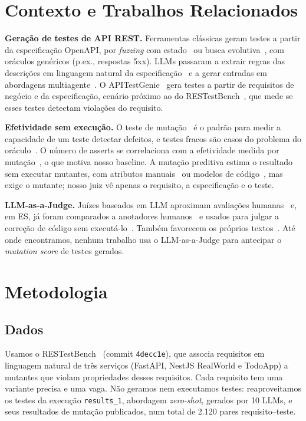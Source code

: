 \documentclass[sigconf,nonacm]{acmart}
\begin{document}
\section{Contexto e Trabalhos Relacionados}
\textbf{Geração de testes de API REST.} Ferramentas clássicas geram testes a partir da especificação OpenAPI,
por \emph{fuzzing} com estado~\cite{atlidakis2019restler} ou busca evolutiva~\cite{arcuri2019evomaster}, com
oráculos genéricos (p.ex., respostas 5xx). LLMs passaram a extrair regras das descrições em linguagem natural
da especificação~\cite{kim2024restgpt} e a gerar entradas em abordagens multiagente~\cite{kim2025multiagent}.
O APITestGenie~\cite{pereira2026apitestgenie} gera testes a partir de requisitos de negócio e da
especificação, cenário próximo ao do RESTestBench~\cite{restestbench}, que mede se esses testes detectam
violações do requisito.

\textbf{Efetividade sem execução.} O teste de mutação~\cite{jia2011mutation} é o padrão para medir a
capacidade de um teste detectar defeitos, e testes fracos são casos do problema do
oráculo~\cite{barr2015oracle}. O número de asserts se correlaciona com a efetividade medida por
mutação~\cite{zhang2015assertions}, o que motiva nosso baseline. A mutação preditiva estima o resultado sem
executar mutantes, com atributos manuais~\cite{zhang2016predictive} ou modelos de
código~\cite{jain2023contextual}, mas exige o mutante; nosso juiz vê apenas o requisito, a especificação e o
teste.

\textbf{LLM-as-a-Judge.} Juízes baseados em LLM aproximam avaliações humanas~\cite{zheng2023judging} e, em ES, já foram
comparados a anotadores humanos~\cite{ahmed2025annotation,wang2025judge} e usados para julgar a correção de
código sem executá-lo~\cite{tong2024codejudge}. Também favorecem os próprios textos~\cite{panickssery2024self}.
Até onde encontramos, nenhum trabalho usa o LLM-as-a-Judge para antecipar o \emph{mutation score} de testes gerados.

\section{Metodologia}
\subsection{Dados}
Usamos o RESTestBench~\cite{restestbench} (commit \texttt{4decc1e}), que associa requisitos em linguagem
natural de três serviços (FastAPI, NestJS RealWorld e TodoApp) a mutantes que violam propriedades desses
requisitos. Cada requisito tem uma variante precisa e uma vaga. Não geramos nem executamos testes:
reaproveitamos os testes da execução \texttt{results\_1}, abordagem \emph{zero-shot}, gerados por 10 LLMs,
e seus resultados de mutação publicados, num total de 2.120 pares requisito--teste.
\end{document}
